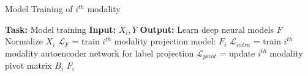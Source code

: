 \begin{algorithm}[htbp]
\caption{Model Training of $i^{th}$ modality}
\label{alg:training}
\begin{algorithmic}[1]
    \State \textbf{Task:} Model training
    \State \textbf{Input:} $X_{i}, Y$
    \State \textbf{Output:} Learn deep neural models $F$
    \State Normalize $X_{i}$
        \State $\mathcal{L}_{F}$ = train $i^{th}$ modality projection model: $F_i$
        \State $\mathcal{L}_{intra}$ = train $i^{th}$ modality autoencoder network for label projection
        \State $\mathcal{L}_{pivot}$ = update $i^{th}$ modality pivot matrix $B_i$
    \EndWhile
    \State \Return $F_i$
\end{algorithmic}
\end{algorithm}

